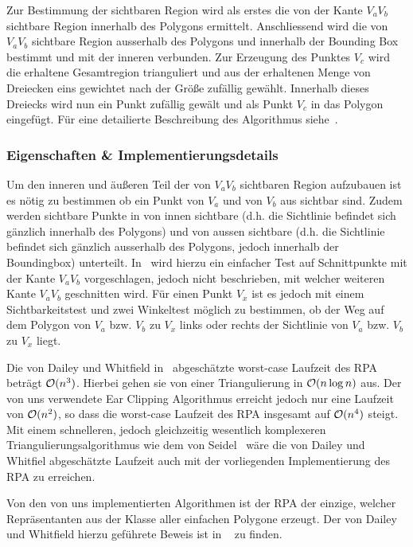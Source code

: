     Zur Bestimmung der sichtbaren Region wird als erstes die von der Kante 
    $V_aV_b$
    sichtbare Region innerhalb des Polygons ermittelt. Anschliessend wird die
    von $V_aV_b$ sichtbare Region ausserhalb des Polygons und innerhalb der
    Bounding Box bestimmt und mit der inneren verbunden. Zur Erzeugung des
    Punktes $V_c$ wird die erhaltene Gesamtregion trianguliert und aus der
    erhaltenen Menge von Dreiecken eins gewichtet nach der Größe zufällig
    gewählt. Innerhalb dieses Dreiecks wird nun ein Punkt zufällig gewält und
    als Punkt $V_c$ in das Polygon eingefügt. Für eine detailierte Beschreibung
    des Algorithmus siehe~\cite{dailey08rpa}.
  

  \subsubsection{Eigenschaften \& Implementierungsdetails} %
  \label{ssub:eigenschaften}

    Um den inneren und äußeren Teil der von $V_aV_b$ sichtbaren Region
    aufzubauen ist es nötig zu bestimmen ob ein Punkt von $V_a$ und von $V_b$
    aus sichtbar sind. Zudem werden sichtbare Punkte in von innen sichtbare
    (d.h. die Sichtlinie befindet sich gänzlich innerhalb des Polygons) und
    von aussen sichtbare (d.h. die Sichtlinie befindet sich gänzlich
    ausserhalb des Polygons, jedoch innerhalb der Boundingbox) unterteilt.
    In~\cite{dailey08rpa} wird hierzu ein einfacher Test auf Schnittpunkte mit
    der Kante $V_aV_b$ vorgeschlagen, jedoch nicht beschrieben, mit welcher
    weiteren Kante $V_aV_b$ geschnitten wird. Für einen Punkt $V_x$ ist es
    jedoch mit einem Sichtbarkeitstest und zwei Winkeltest möglich zu
    bestimmen, ob der Weg auf dem Polygon von $V_a$ bzw. $V_b$ zu $V_x$ links
    oder rechts der Sichtlinie von $V_a$ bzw. $V_b$ zu $V_x$ liegt.

    Die von Dailey und Whitfield in~\cite{dailey08rpa} abgeschätzte worst-case
    Laufzeit des RPA beträgt $\mathcal{O}(n^3)$. Hierbei gehen sie von einer
    Triangulierung in $\mathcal{O}(n \log n)$ aus. Der von uns verwendete Ear
    Clipping Algorithmus erreicht jedoch nur eine Laufzeit von $\mathcal{O}(n^2)$,
    so dass die worst-case Laufzeit des RPA insgesamt auf $\mathcal{O}(n^4)$ steigt.
    Mit einem schnelleren, jedoch gleichzeitig wesentlich komplexeren
    Triangulierungsalgorithmus wie dem von Seidel~\cite{seidel91asimple} wäre
    die von Dailey und Whitfiel abgeschätzte Laufzeit auch mit der
    vorliegenden Implementierung des RPA zu erreichen.

    Von den von uns implementierten Algorithmen ist der RPA der einzige,
    welcher Repräsentanten aus der Klasse aller einfachen Polygone erzeugt.
    Der von Dailey und Whitfield hierzu geführete Beweis ist in
    ~\cite{dailey08rpa} zu finden.


